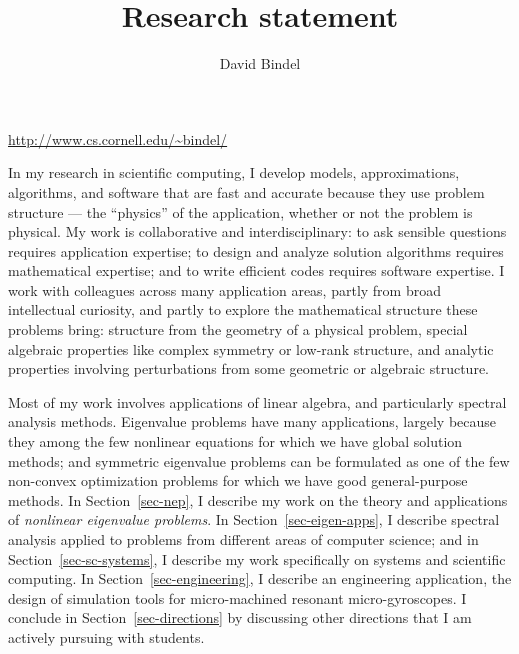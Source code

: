 \documentclass{amsart}
\title{Research statement}
\author{David Bindel}
\begin{document}
\maketitle
\vspace{-5mm}
\begin{center}
\url{http://www.cs.cornell.edu/~bindel/}
\end{center}
\vspace{+5mm}


In my research in scientific computing,
I develop models, approximations, algorithms, and software that
are fast and accurate because they use problem structure --- the
``physics'' of the application, whether or not the problem is physical.
%
My work is collaborative and interdisciplinary: to ask sensible questions
requires application expertise; to design and analyze solution
algorithms requires mathematical expertise; and to write efficient
codes requires software expertise.
%
I work with colleagues across many application areas, partly from
broad intellectual curiosity, and partly to explore the mathematical
structure these problems bring:
%
structure from the geometry of a physical problem,
special algebraic properties like complex symmetry or
low-rank structure, and
analytic properties involving perturbations from some geometric or
algebraic structure.

Most of my work involves applications of linear algebra, and
particularly spectral analysis methods.
%
Eigenvalue problems have many applications, largely because they among
the few nonlinear equations for which we have global solution methods;
and symmetric eigenvalue problems can be formulated as one of the few
non-convex optimization problems for which we have good general-purpose
methods.
%
%
In Section~\ref{sec-nep}, I describe my work on the theory and
applications of {\em nonlinear eigenvalue problems}.
%
In Section~\ref{sec-eigen-apps}, I describe spectral analysis applied to
problems from different areas of computer science; and in
Section~\ref{sec-sc-systems}, I describe my work specifically on systems
and scientific computing. In Section~\ref{sec-engineering}, I describe
an engineering application, the design of simulation tools for
micro-machined resonant micro-gyroscopes. I conclude in
Section~\ref{sec-directions} by discussing other directions
that I am actively pursuing with students.
\end{document}
